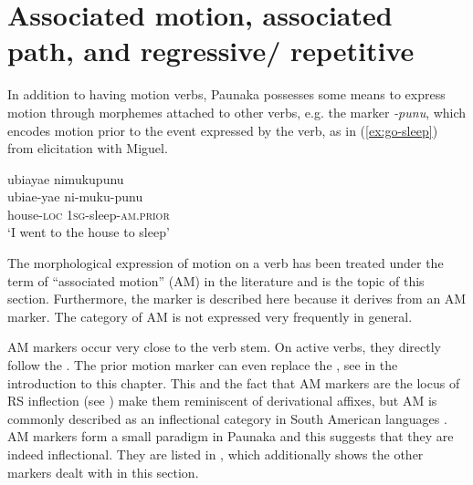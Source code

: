 
\section{Associated motion, associated path, and regressive/ repetitive}\label{sec:AssociatedMotion}

In addition to having motion verbs, Paunaka possesses some means to express motion through morphemes attached to other verbs, e.g. the marker \textit{-punu}, which encodes motion prior to the event expressed by the verb, as in (\ref{ex:go-sleep}) from elicitation with Miguel.

\ea\label{ex:go-sleep}
\begingl 
\glpreamble ubiayae nimukupunu\\
\gla ubiae-yae ni-muku-punu\\ 
\glb house-\textsc{loc} 1\textsc{sg}-sleep-\textsc{am.prior}\\ 
\glft ‘I went to the house to sleep’\\ 
\endgl
\trailingcitation{[jmx-e090727s.348]}
\xe


The morphological expression of motion on a verb has been treated under the term of “associated motion” (AM) in the literature and is the topic of this section. Furthermore, the  marker is described here because it derives from an AM marker. The category of AM is not expressed very frequently in general.

AM markers occur very close to the verb stem. On active verbs, they directly follow the . The prior motion marker can even replace the , see  in the introduction to this chapter. This and the fact that AM markers are the locus of RS inflection (see ) make them reminiscent of derivational affixes, but AM is commonly described as an inflectional category in South American languages \citep[cf.][]{Guillaume2016}. AM markers form a small paradigm in Paunaka and this suggests that they are indeed inflectional. They are listed in , which additionally shows the other markers dealt with in this section.

